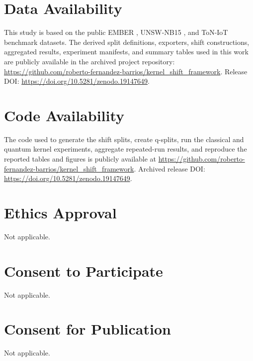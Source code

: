 \documentclass[journal]{IEEEtran}
\begin{document}
\section*{Data Availability}
This study is based on the public EMBER \cite{anderson2018ember}, UNSW-NB15 \cite{moustafa2015unsw}, and ToN-IoT \cite{alsaedi2020toniot} benchmark datasets. The derived split definitions, exporters, shift constructions, aggregated results, experiment manifests, and summary tables used in this work are publicly available in the archived project repository: \url{https://github.com/roberto-fernandez-barrios/kernel_shift_framework}. Release DOI: \url{https://doi.org/10.5281/zenodo.19147649}.

\section*{Code Availability}
The code used to generate the shift splits, create q-splits, run the classical and quantum kernel experiments, aggregate repeated-run results, and reproduce the reported tables and figures is publicly available at \url{https://github.com/roberto-fernandez-barrios/kernel_shift_framework}. Archived release DOI: \url{https://doi.org/10.5281/zenodo.19147649}.

\section*{Ethics Approval}
Not applicable.

\section*{Consent to Participate}
Not applicable.

\section*{Consent for Publication}
Not applicable.







\end{document}
